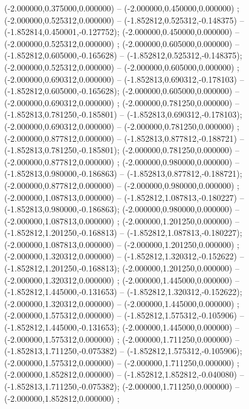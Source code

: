  (-2.000000,0.375000,0.000000) -- (-2.000000,0.450000,0.000000) ;
 (-2.000000,0.525312,0.000000) -- (-1.852812,0.525312,-0.148375) -- (-1.852814,0.450001,-0.127752);
 (-2.000000,0.450000,0.000000) -- (-2.000000,0.525312,0.000000) ;
 (-2.000000,0.605000,0.000000) -- (-1.852812,0.605000,-0.165628) -- (-1.852812,0.525312,-0.148375);
 (-2.000000,0.525312,0.000000) -- (-2.000000,0.605000,0.000000) ;
 (-2.000000,0.690312,0.000000) -- (-1.852813,0.690312,-0.178103) -- (-1.852812,0.605000,-0.165628);
 (-2.000000,0.605000,0.000000) -- (-2.000000,0.690312,0.000000) ;
 (-2.000000,0.781250,0.000000) -- (-1.852813,0.781250,-0.185801) -- (-1.852813,0.690312,-0.178103);
 (-2.000000,0.690312,0.000000) -- (-2.000000,0.781250,0.000000) ;
 (-2.000000,0.877812,0.000000) -- (-1.852813,0.877812,-0.188721) -- (-1.852813,0.781250,-0.185801);
 (-2.000000,0.781250,0.000000) -- (-2.000000,0.877812,0.000000) ;
 (-2.000000,0.980000,0.000000) -- (-1.852813,0.980000,-0.186863) -- (-1.852813,0.877812,-0.188721);
 (-2.000000,0.877812,0.000000) -- (-2.000000,0.980000,0.000000) ;
 (-2.000000,1.087813,0.000000) -- (-1.852812,1.087813,-0.180227) -- (-1.852813,0.980000,-0.186863);
 (-2.000000,0.980000,0.000000) -- (-2.000000,1.087813,0.000000) ;
 (-2.000000,1.201250,0.000000) -- (-1.852812,1.201250,-0.168813) -- (-1.852812,1.087813,-0.180227);
 (-2.000000,1.087813,0.000000) -- (-2.000000,1.201250,0.000000) ;
 (-2.000000,1.320312,0.000000) -- (-1.852812,1.320312,-0.152622) -- (-1.852812,1.201250,-0.168813);
 (-2.000000,1.201250,0.000000) -- (-2.000000,1.320312,0.000000) ;
 (-2.000000,1.445000,0.000000) -- (-1.852812,1.445000,-0.131653) -- (-1.852812,1.320312,-0.152622);
 (-2.000000,1.320312,0.000000) -- (-2.000000,1.445000,0.000000) ;
 (-2.000000,1.575312,0.000000) -- (-1.852812,1.575312,-0.105906) -- (-1.852812,1.445000,-0.131653);
 (-2.000000,1.445000,0.000000) -- (-2.000000,1.575312,0.000000) ;
 (-2.000000,1.711250,0.000000) -- (-1.852813,1.711250,-0.075382) -- (-1.852812,1.575312,-0.105906);
 (-2.000000,1.575312,0.000000) -- (-2.000000,1.711250,0.000000) ;
 (-2.000000,1.852812,0.000000) -- (-1.852812,1.852812,-0.040080) -- (-1.852813,1.711250,-0.075382);
 (-2.000000,1.711250,0.000000) -- (-2.000000,1.852812,0.000000) ;
